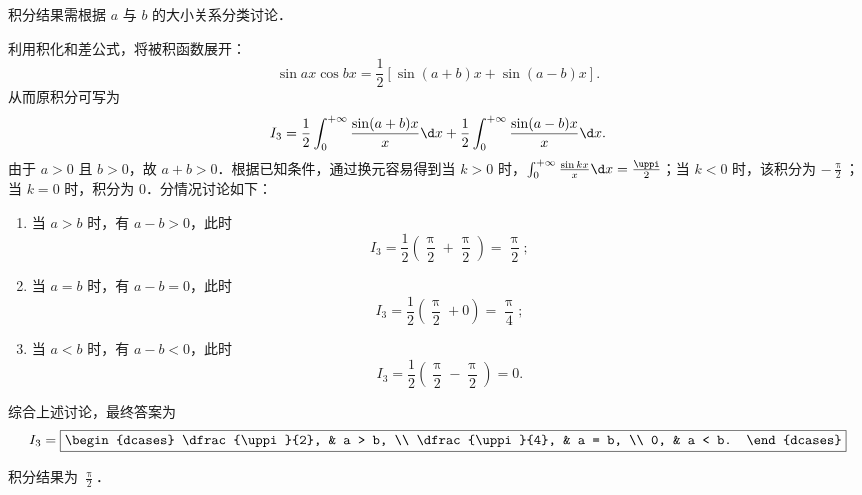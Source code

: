\begin{solution}
     积分结果需根据 $a$ 与 $b$ 的大小关系分类讨论．

    利用积化和差公式，将被积函数展开：
    \begin{equation}\label{eq:int3-1}
        \sin ax \cos bx = \frac{1}{2} \left[ \sin(a+b)x + \sin(a-b)x \right].
    \end{equation}
    从而原积分可写为
    \begin{equation}\label{eq:int3-2}
        I_3 = \frac{1}{2} \int_{0}^{+\infty} \frac{\sin(a+b)x}{x} \d x + \frac{1}{2} \int_{0}^{+\infty} \frac{\sin(a-b)x}{x} \d x.
    \end{equation}
    由于 $a > 0$ 且 $b > 0$，故 $a+b > 0$．根据已知条件，通过换元容易得到当 $k > 0$ 时，$\int_{0}^{+\infty} \frac{\sin kx}{x} \d x = \frac{\uppi}{2}$；当 $k < 0$ 时，该积分为 $-\frac{\uppi}{2}$；当 $k = 0$ 时，积分为 $0$．分情况讨论如下：
    \begin{enumerate}
        \item 当 $a > b$ 时，有 $a-b > 0$，此时
              \begin{equation}\label{eq:int3-case1}
                  I_3 = \frac{1}{2} \left( \frac{\uppi}{2} + \frac{\uppi}{2} \right) = \frac{\uppi}{2};
              \end{equation}
        \item 当 $a = b$ 时，有 $a-b = 0$，此时
              \begin{equation}\label{eq:int3-case2}
                  I_3 = \frac{1}{2} \left( \frac{\uppi}{2} + 0 \right) = \frac{\uppi}{4};
              \end{equation}
        \item 当 $a < b$ 时，有 $a-b < 0$，此时
              \begin{equation}\label{eq:int3-case3}
                  I_3 = \frac{1}{2} \left( \frac{\uppi}{2} - \frac{\uppi}{2} \right) = 0.
              \end{equation}
    \end{enumerate}
    综合上述讨论，最终答案为
    \begin{equation}
        I_3 = \boxed{\begin{dcases} \dfrac{\uppi}{2}, & a > b, \\ \dfrac{\uppi}{4}, & a = b, \\ 0, & a < b. \end{dcases}}
    \end{equation}

     积分结果为 $\frac{\uppi}{2}$．


\end{solution}
